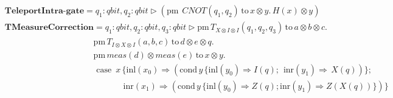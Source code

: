 \begin{align*}
      &\textbf{TeleportIntra-gate} =  q_{1}: \textit{qbit}, q_{2}: \textit{qbit}  \triangleright  (\text{pm}  \hspace{5pt} \textit{CNOT} (q_{1},q_{2})  \hspace{2pt}  \text{to} \hspace{2pt} x \otimes y.  \hspace{2pt}  \textit{H} (x) \otimes y) \\
      &\textbf{TMeasureCorrection}= q_{1}: \textit{qbit}, q_{2}: \textit{qbit},  q_{3}: \textit{qbit} \triangleright \text{pm} \hspace{2pt} T_{X \otimes I \otimes I} (q_{1},q_{2},q_{3}) \hspace{2pt} \text{to} \hspace{2pt} a \otimes b \otimes c . \hspace{2pt}   \\
      &\hspace{125pt} \text{pm} \hspace{2pt} T_{I \otimes X \otimes I} (a,b,c) \hspace{2pt} \text{to} \hspace{2pt} d \otimes e \otimes q. \\
      & \hspace{125pt} \text{pm} \hspace{2pt} \textit{meas} (d) \otimes \textit{meas} (e)  \hspace{2pt} \text{to} \hspace{2pt} x \otimes y. \hspace{2pt} \\
      &  \hspace{125pt} \text{ case }\hspace{2pt} x \hspace{2pt}  \{\text{inl} (x_{0}) \Rightarrow  (\text{cond}\hspace{2pt} y  \hspace{2pt}  \{\text{inl} (y_{0})  \Rightarrow{}  \textit{I}(q) ;  \hspace{5pt} \text{inr} (y_{1}) \Rightarrow  \hspace{2pt}   \textit{X} (q)) \}; \\
      & \hspace{167pt}\text{inr} (x_{1})  \Rightarrow  (\text{cond}\hspace{2pt} y  \hspace{2pt}  \{\text{inl} (y_{0})  \Rightarrow   \textit{Z}(q); \text{inr} (y_{1}) \Rightarrow{} \textit{Z} (\textit{X}(q)) \})\}
 \end{align*}

